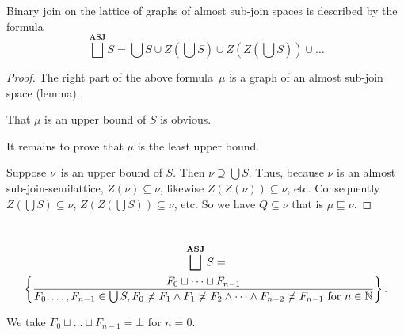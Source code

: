 \begin{prop}
Binary join on the lattice of graphs of almost sub-join spaces is described by the formula
\[
\bigsqcup^{\mathbf{ASJ}}S = \bigcup S\cup Z\left(\bigcup S\right)\cup Z\left(Z\left(\bigcup S\right)\right)\cup\dots
\]
\end{prop}

\begin{proof}
The right part of the above formula~$\mu$ is a graph of an almost sub-join space (lemma).

That $\mu$ is an upper bound of $S$ is obvious.

It remains to prove that $\mu$ is the least upper bound.

Suppose $\nu$~is an upper bound of $S$. Then $\nu\supseteq\bigcup S$. Thus, because $\nu$ is an almost sub-join-semilattice,
$Z(\nu)\subseteq\nu$, likewise $Z(Z(\nu))\subseteq\nu$, etc. Consequently $Z(\bigcup S)\subseteq\nu$, $Z(Z(\bigcup S))\subseteq\nu$, etc.
So we have $Q\subseteq\nu$ that is $\mu\sqsubseteq\nu$.
\end{proof}

\begin{prop}
~ 
\begin{multline*}
\bigsqcup^{\mathbf{ASJ}}S = \\
\setcond{F_0\sqcup\dots\sqcup F_{n-1}}{F_0,\dots,F_{n-1}\in\bigcup S,F_0\nasymp F_1\land F_1\nasymp F_2\land\dots\land F_{n-2}\nasymp F_{n-1} \text{ for } n\in\mathbb{N}}.
\end{multline*}
\end{prop}

\begin{rem}
We take $F_0\sqcup\dots\sqcup F_{n-1} = \bot$ for $n=0$.
\end{rem}

